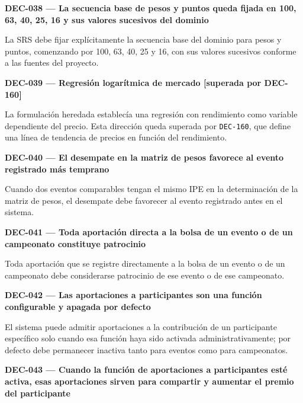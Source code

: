\documentclass[10pt,letterpaper]{article}
\begin{document}
\noindent\textbf{DEC-038 --- La secuencia base de pesos y puntos queda fijada en 100, 63, 40, 25, 16 y sus valores sucesivos del dominio}\par
La SRS debe fijar explícitamente la secuencia base del dominio para pesos y puntos, comenzando por 100, 63, 40, 25 y 16, con sus valores sucesivos conforme a las fuentes del proyecto.\par\vspace{0.45em}
\noindent\textbf{DEC-039 --- Regresión logarítmica de mercado [superada por DEC-160]}\par
La formulación heredada establecía una regresión con rendimiento como variable dependiente del precio. Esta dirección queda superada por \texttt{DEC-160}, que define una línea de tendencia de precios en función del rendimiento.\par\vspace{0.45em}
\noindent\textbf{DEC-040 --- El desempate en la matriz de pesos favorece al evento registrado más temprano}\par
Cuando dos eventos comparables tengan el mismo IPE en la determinación de la matriz de pesos, el desempate debe favorecer al evento registrado antes en el sistema.\par\vspace{0.45em}
\noindent\textbf{DEC-041 --- Toda aportación directa a la bolsa de un evento o de un campeonato constituye patrocinio}\par
Toda aportación que se registre directamente a la bolsa de un evento o de un campeonato debe considerarse patrocinio de ese evento o de ese campeonato.\par\vspace{0.45em}
\noindent\textbf{DEC-042 --- Las aportaciones a participantes son una función configurable y apagada por defecto}\par
El sistema puede admitir aportaciones a la contribución de un participante específico solo cuando esa función haya sido activada administrativamente; por defecto debe permanecer inactiva tanto para eventos como para campeonatos.\par\vspace{0.45em}
\noindent\textbf{DEC-043 --- Cuando la función de aportaciones a participantes esté activa, esas aportaciones sirven para compartir y aumentar el premio del participante}\par
\end{document}
